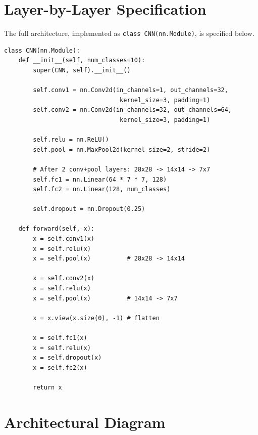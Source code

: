 \documentclass[12pt,a4paper]{report}
\begin{document}
\section{Layer-by-Layer Specification}
The full architecture, implemented as \texttt{class CNN(nn.Module)}, is specified below.

\begin{lstlisting}[caption={CNN architecture definition}, label={lst:cnn}]
class CNN(nn.Module):
    def __init__(self, num_classes=10):
        super(CNN, self).__init__()

        self.conv1 = nn.Conv2d(in_channels=1, out_channels=32,
                                kernel_size=3, padding=1)
        self.conv2 = nn.Conv2d(in_channels=32, out_channels=64,
                                kernel_size=3, padding=1)

        self.relu = nn.ReLU()
        self.pool = nn.MaxPool2d(kernel_size=2, stride=2)

        # After 2 conv+pool layers: 28x28 -> 14x14 -> 7x7
        self.fc1 = nn.Linear(64 * 7 * 7, 128)
        self.fc2 = nn.Linear(128, num_classes)

        self.dropout = nn.Dropout(0.25)

    def forward(self, x):
        x = self.conv1(x)
        x = self.relu(x)
        x = self.pool(x)          # 28x28 -> 14x14

        x = self.conv2(x)
        x = self.relu(x)
        x = self.pool(x)          # 14x14 -> 7x7

        x = x.view(x.size(0), -1) # flatten

        x = self.fc1(x)
        x = self.relu(x)
        x = self.dropout(x)
        x = self.fc2(x)

        return x
\end{lstlisting}

\section{Architectural Diagram}
\end{document}
